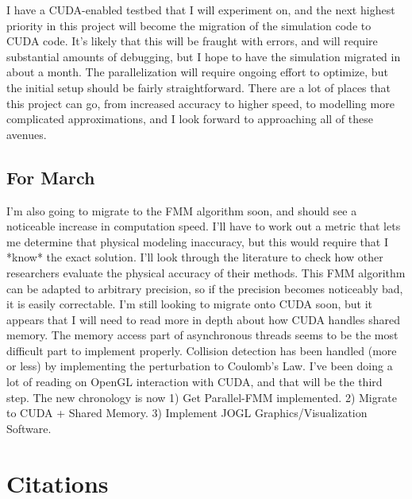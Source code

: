 \documentclass[10pt]{article}
\begin{document}
I have a CUDA-enabled testbed that I will experiment on, and the next highest priority in this project will become the migration of the simulation code to CUDA code. It's likely that this will be fraught with errors, and will require substantial amounts of debugging, but I hope to have the simulation migrated in about a month. The parallelization will require ongoing effort to optimize, but the initial setup should be fairly straightforward. There are a lot of places that this project can go, from increased accuracy to higher speed, to modelling more complicated approximations, and I look forward to approaching all of these avenues.

\subsection{For March}
I'm also going to migrate to the FMM algorithm soon, and should see a noticeable increase in computation speed. I'll have to work out a metric that lets me determine that physical modeling inaccuracy, but this would require that I *know* the exact solution. I'll look through the literature to check how other researchers evaluate the physical accuracy of their methods. This FMM algorithm can be adapted to arbitrary precision, so if the precision becomes noticeably bad, it is easily correctable. I'm still looking to migrate onto CUDA soon, but it appears that I will need to read more in depth about how CUDA handles shared memory. The memory access part of asynchronous threads seems to be the most difficult part to implement properly. Collision detection has been handled (more or less) by implementing the perturbation to Coulomb's Law. I've been doing a lot of reading on OpenGL interaction with CUDA, and that will be the third step. The new chronology is now 1) Get Parallel-FMM implemented. 2) Migrate to CUDA + Shared Memory. 3) Implement JOGL Graphics/Visualization Software.


\section{Citations}
\end{document}
